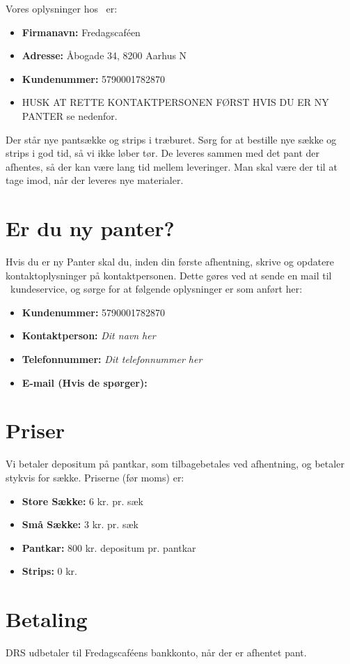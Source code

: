 Vores oplysninger hos \DRS~er:
\begin{itemize}
		\item \textbf{Firmanavn:} Fredagscaféen
		\item \textbf{Adresse:} Åbogade 34, 8200 Aarhus N
		\item \textbf{Kundenummer:} 5790001782870
		\item HUSK AT RETTE KONTAKTPERSONEN FØRST HVIS DU ER NY PANTER se nedenfor.
\end{itemize}

Der står nye pantsække og strips i træburet. Sørg for at bestille nye sække og strips i god tid, så vi ikke løber tør. De leveres sammen med det pant der afhentes, så der kan være lang tid mellem leveringer. Man skal være der til at tage imod, når der leveres nye materialer.


\section{Er du ny panter?}
\label{sec:Er du ny Panter?}

Hvis du er ny Panter skal du, inden din første afhentning, skrive og opdatere kontaktoplysninger på kontaktpersonen.
Dette gøres ved at sende en mail til \DRS~kundeservice, og sørge for at følgende oplysninger er som anført her:

\begin{itemize}
	\item \textbf{Kundenummer:} 5790001782870
	\item \textbf{Kontaktperson:} \textit{Dit navn her}
	\item \textbf{Telefonnummer:} \textit{Dit telefonnummer her}
	\item \textbf{E-mail (Hvis de spørger):} \bestmail
\end{itemize}

\section{Priser}
Vi betaler depositum på pantkar, som tilbagebetales ved afhentning, og betaler stykvis for sække. Priserne (før moms) er:
\begin{itemize}
	\item \textbf{Store Sække:} 6 kr. pr. sæk
	\item \textbf{Små Sække:} 3 kr. pr. sæk
	\item \textbf{Pantkar:} 800 kr. depositum pr. pantkar
	\item \textbf{Strips:} 0 kr.
\end{itemize}


\section{Betaling}
DRS udbetaler til Fredagscaféens bankkonto, når der er afhentet pant. 







